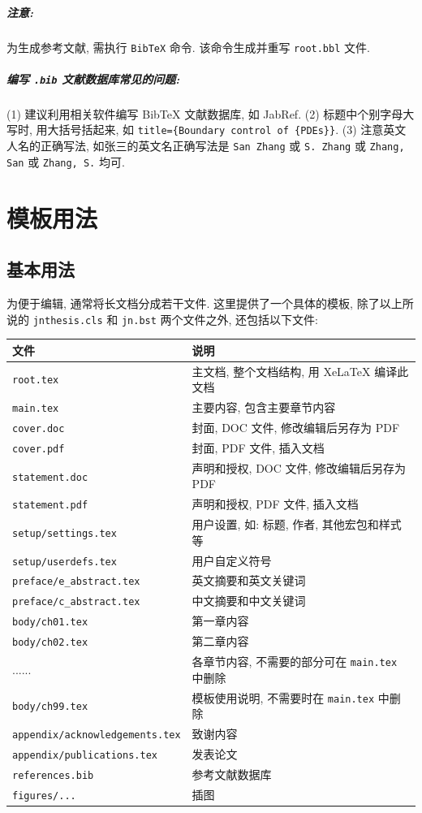 \subparagraph{注意:} 为生成参考文献, 需执行 {\tt BibTeX} 命令. 该命令生成并重写 {\tt root.bbl} 文件.

\subparagraph{编写 {\tt .bib} 文献数据库常见的问题:}
(1) 建议利用相关软件编写 BibTeX 文献数据库, 如 JabRef.
(2) 标题中个别字母大写时, 用大括号括起来, 如 {\tt title=\{Boundary control of \{PDEs\}\}}. (3) 注意英文人名的正确写法, 如张三的英文名正确写法是 {\tt San Zhang} 或 {\tt S. Zhang} 或 {\tt Zhang, San} 或 {\tt Zhang, S.} 均可.

\section{模板用法}

\subsection{基本用法}

为便于编辑, 通常将长文档分成若干文件.
这里提供了一个具体的模板,
除了以上所说的 {\tt jnthesis.cls} 和 {\tt jn.bst} 两个文件之外,
还包括以下文件:

\begin{tabular}{ll}
\hline
文件 & 说明\\
\hline
{\tt root.tex} & 主文档, 整个文档结构, 用 XeLaTeX 编译此文档\\
{\tt main.tex} & 主要内容, 包含主要章节内容\\
\hline
{\tt cover.doc} & 封面, DOC 文件, 修改编辑后另存为 PDF\\
{\tt cover.pdf} & 封面, PDF 文件, 插入文档\\
{\tt statement.doc} & 声明和授权, DOC 文件, 修改编辑后另存为 PDF\\
{\tt statement.pdf} & 声明和授权, PDF 文件, 插入文档\\
\hline
{\tt setup/settings.tex} & 用户设置, 如: 标题, 作者, 其他宏包和样式等\\
{\tt setup/userdefs.tex} & 用户自定义符号\\
\hline
{\tt preface/e\_abstract.tex} & 英文摘要和英文关键词\\
{\tt preface/c\_abstract.tex} & 中文摘要和中文关键词\\
\hline
{\tt body/ch01.tex} & 第一章内容\\
{\tt body/ch02.tex} & 第二章内容\\
...... & 各章节内容, 不需要的部分可在 {\tt main.tex} 中删除\\
{\tt body/ch99.tex} & 模板使用说明, 不需要时在 {\tt main.tex} 中删除\\
\hline
{\tt appendix/acknowledgements.tex} & 致谢内容\\
{\tt appendix/publications.tex} & 发表论文\\
\hline
{\tt references.bib} & 参考文献数据库\\
{\tt figures/...} & 插图\\
\hline
\end{tabular}


